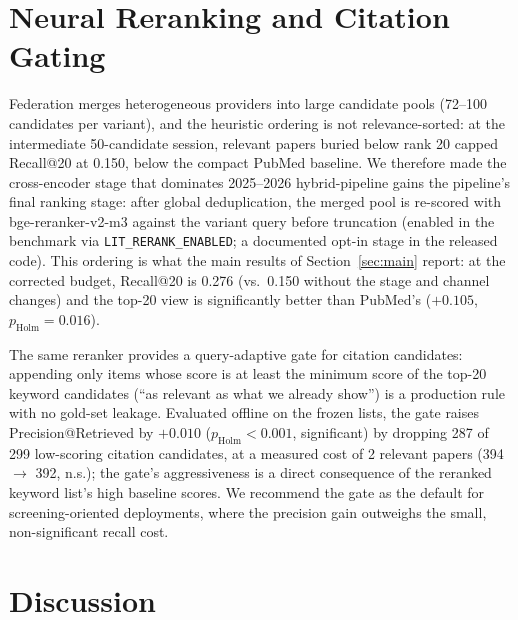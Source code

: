 \documentclass[sigconf,screen]{acmart}
\begin{document}
\section{Neural Reranking and Citation Gating}
\label{sec:rerank}

Federation merges heterogeneous providers into large candidate pools
(72--100 candidates per variant), and the heuristic ordering is not
relevance-sorted: at the intermediate 50-candidate session, relevant
papers buried below rank 20 capped Recall@20 at 0.150, below the compact
PubMed baseline. We therefore made the cross-encoder
stage that dominates 2025--2026 hybrid-pipeline gains the pipeline's
final ranking stage: after global deduplication, the merged pool is
re-scored with bge-reranker-v2-m3 against the variant query before
truncation (enabled in the benchmark via \texttt{LIT\_RERANK\_ENABLED};
a documented opt-in stage in the released code). This ordering is what
the main results of Section~\ref{sec:main} report: at the corrected
budget, Recall@20 is 0.276 (vs.\ 0.150 without the stage and channel
changes) and the top-20 view is significantly better than PubMed's
($+0.105$, $p_{\text{Holm}}{=}0.016$).

The same reranker provides a query-adaptive gate for citation candidates:
appending only items whose score is at least the minimum score of the
top-20 keyword candidates (``as relevant as what we already show'') is a
production rule with no gold-set leakage. Evaluated offline on the frozen
lists, the gate raises Precision@Retrieved by
$+0.010$ ($p_{\text{Holm}}{<}0.001$, significant) by dropping 287 of 299
low-scoring citation candidates, at a measured cost of 2 relevant papers
(394 $\rightarrow$ 392, n.s.); the gate's aggressiveness is a direct
consequence of the reranked keyword list's high baseline scores. We
recommend the gate as the default for screening-oriented deployments,
where the precision gain outweighs the small, non-significant recall
cost.



\section{Discussion}
\label{sec:discussion}
\end{document}

